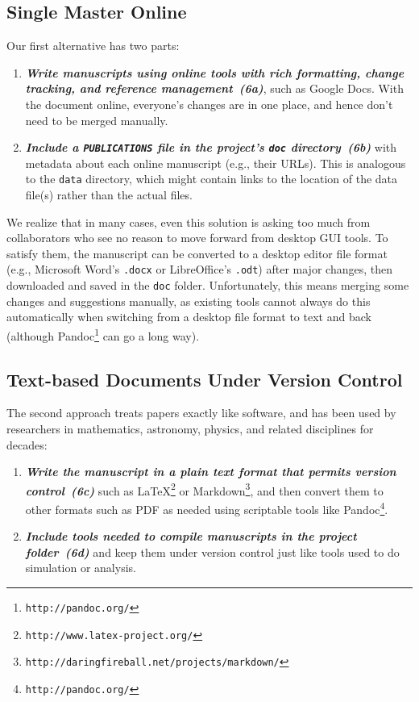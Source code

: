 \documentclass[10pt,letterpaper]{article}
\newcommand{\withurl}[2]{{#1}\footnote{{\texttt{#2}}}}
\newcommand{\practice}[2]{\textbf{\emph{{#2}~({#1})}}}
\begin{document}
\subsection*{Single Master Online}

Our first alternative has two parts:

\begin{enumerate}

\item
  \practice{6a}{Write manuscripts using online tools with rich
    formatting, change tracking, and reference management}, such as
  Google Docs. With the document online, everyone's
  changes are in one place, and hence don't need to be merged
  manually.

\item
  \practice{6b}{Include a \texttt{PUBLICATIONS} file in the project's
    \texttt{doc} directory} with metadata about each online manuscript
  (e.g., their URLs). This is analogous to the \texttt{data}
  directory, which might contain links to the location of the data
  file(s) rather than the actual files.

\end{enumerate}

We realize that in many cases, even this solution is asking too much
from collaborators who see no reason to move forward from desktop GUI
tools. To satisfy them, the manuscript can be converted to a desktop
editor file format (e.g., Microsoft Word's \texttt{.docx} or
LibreOffice's \texttt{.odt}) after major changes, then downloaded and
saved in the \texttt{doc} folder. Unfortunately, this means merging
some changes and suggestions manually, as existing tools cannot always
do this automatically when switching from a desktop file format to
text and back (although \withurl{Pandoc}{http://pandoc.org/} can go a
long way).

\subsection*{Text-based Documents Under Version Control}

The second approach treats papers exactly like software, and has been
used by researchers in mathematics, astronomy, physics, and related
disciplines for decades:

\begin{enumerate}

\item
  \practice{6c}{Write the manuscript in a plain text format that permits
    version control} such as
  \withurl{LaTeX}{http://www.latex-project.org/} or
  \withurl{Markdown}{http://daringfireball.net/projects/markdown/},
  and then convert them to other formats such as PDF as needed using
  scriptable tools like \withurl{Pandoc}{http://pandoc.org/}.

\item
  \practice{6d}{Include tools needed to compile manuscripts in the
    project folder} and keep them under version control just like
  tools used to do simulation or analysis.

\end{enumerate}
\end{document}
